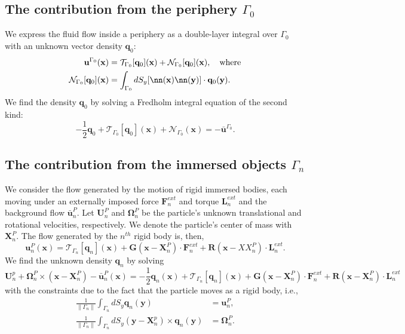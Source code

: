 \documentclass{article}
\newcommand{\OOmega}{\boldsymbol{\Omega}}
\newcommand{\uu}{\mathbf{u}}
\newcommand{\UU}{\mathbf{U}}
\newcommand{\XX}{\mathbf{X}}
\newcommand{\RR}{\mathbf{R}}
\newcommand{\xx}{\mathbf{x}}
\newcommand{\yy}{\mathbf{y}}
\newcommand{\qq}{\mathbf{q}}
\newcommand{\ubarP}{\bar{\mathbf{u}}^P}
\newcommand{\ubarG}{\bar{\mathbf{u}}^{\Gamma_0}}
\newcommand{\uG}{{\mathbf{u}}^{\Gamma_0}}
\newcommand{\FF}{\mathbf{F}}
\newcommand{\GG}{\mathbf{G}}
\newcommand{\calN}{\mathcal{N}}
\newcommand{\calT}{\mathcal{T}}
\newcommand{\LL}{\mathbf{L}}
\begin{document}
\subsection{The contribution from the periphery $\Gamma_0$}
We express the fluid flow inside a periphery as a double-layer integral over $\Gamma_0$ with an unknown vector density $\qq_0$:
\begin{align}
    \uG(\xx) & = \calT_{\Gamma_0}[\qq_0](\xx) + \calN_{\Gamma_0}[\qq_0](\xx), \quad \text{where} \\
    \calN_{\Gamma_0}[\qq_0](\xx) & = \int_{\Gamma_0}dS_y [\nn(\xx)\nn(\yy)]\cdot\qq_0(\yy).
\end{align}
We find the density $\qq_0$ by solving a Fredholm integral equation of the second kind:
\begin{equation}
    -\frac{1}{2}\qq_0 + \calT_{\Gamma_0}[\qq_0](\xx) + \calN_{\Gamma_0}(\xx) = -\ubarG.
\end{equation}


\subsection{The contribution from the immersed objects $\Gamma_n$}
We consider the flow generated by the motion of rigid immersed bodies, each moving under an externally imposed force $\FF^{ext}_n$ and torque $\LL^{ext}_n$ and the background flow $\ubarP_n$. Let $\UU^P_n$ and $\OOmega^P_n$ be the particle's unknown translational and rotational velocities, respectively. We denote the particle's center of mass with $\XX_n^P$. The flow generated by the $n^{th}$ rigid body is, then,
\begin{equation}
    \uu_n^P(\xx) = \calT_{\Gamma_n}[\qq_n](\xx) + \GG(\xx-\XX_n^P)\cdot\FF_n^{ext} + \RR(\xx-XX_n^P)\cdot\LL_n^{ext}.
\end{equation}
We find the unknown density $\qq_n$ by solving
\begin{equation}
    \UU_n^p + \OOmega_n^P \times (\xx-\XX_n^P) - \ubarP_n(\xx) = -\frac{1}{2}\qq_n(\xx)+\calT_{\Gamma_n}[\qq_n](\xx) + \GG(\xx-\XX_n^P)\cdot\FF_n^{ext} + \RR(\xx-\XX_n^P)\cdot\LL_n^{ext}
\end{equation}
with the constraints due to the fact that the particle moves as a rigid body, i.e.,
\begin{align}
  \frac{1}{\|\Gamma_n\|}\int_{\Gamma_n}dS_y \qq_n(\yy) & = \uu_n^P,\\
  \frac{1}{\|\Gamma_n\|}\int_{\Gamma_n}dS_y (\yy-\XX_n^p) \times \qq_n(\yy) & = \OOmega_n^P.
\end{align}
\end{document}
